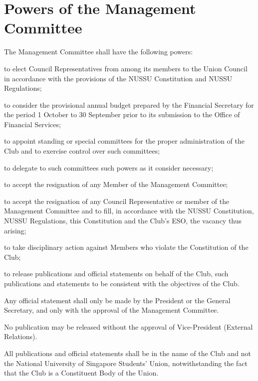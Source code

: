 \section{Powers of the Management Committee}
The Management Committee shall have the following powers:
	\begin{legal}
	\item to elect Council Representatives from among its members to the Union Council in accordance with the provisions of the NUSSU Constitution and NUSSU Regulations;
	\item to consider the provisional annual budget prepared by the Financial Secretary for the period 1 October to 30 September prior to its submission to the Office of Financial Services;
	\item to appoint standing or special committees for the proper administration of the Club and to exercise control over such committees;
		\begin{legal}
		\item to delegate to such committees such powers as it consider necessary;
		\end{legal}
	\item to accept the resignation of any Member of the Management Committee;
		\begin{legal}
		\item to accept the resignation of any Council Representative or member of the Management Committee and to fill, in accordance with the NUSSU Constitution, NUSSU Regulations, this Constitution and the Club's ESO, the vacancy thus arising;
		\end{legal}
	\item to take disciplinary action against Members who violate the Constitution of the Club;
	\item to release publications and official statements on behalf of the Club, such publications and statements to be consistent with the objectives of the Club.
		\begin{legal}
		\item Any official statement shall only be made by the President or the General Secretary, and only with the approval of the Management Committee.
		\item No publication may be released without the approval of Vice-President (External Relations).
		\item All publications and official statements shall be in the name of the Club and not the National University of Singapore Students' Union, notwithstanding the fact that the Club is a Constituent Body of the Union.

\end{legal}
\end{legal}
